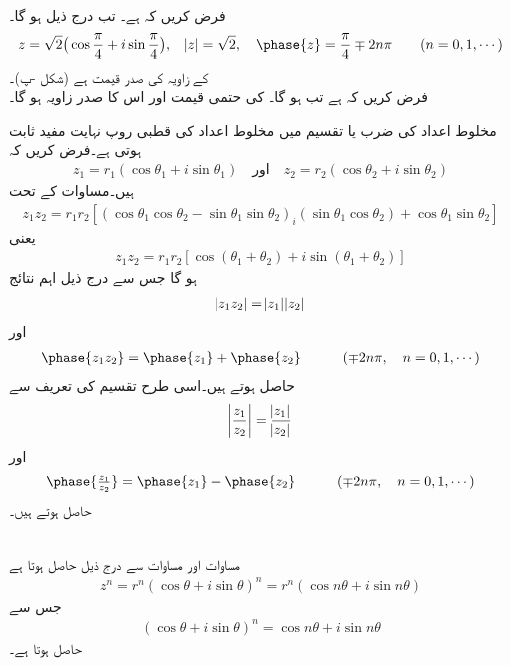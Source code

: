 \quad {}\\
فرض کریں کہ  ہے۔ تب درج ذیل ہو گا۔
\begin{align*}
z=\sqrt{2}\big(\cos \frac{\pi}{4}+i\sin\frac{\pi}{4}\big), \quad \abs{z}=\sqrt{2},\quad \phase{z}=\frac{\pi}{4}\mp2n\pi \quad \quad (n=0,1,\cdots)
\end{align*}
 کے زاویہ کی صدر قیمت  ہے (شکل -پ)۔
\quad {}\\
فرض کریں کہ  ہے تب  ہو گا۔ کی حتمی قیمت  اور اس کا صدر زاویہ  ہو گا۔

مخلوط اعداد کی  ضرب یا تقسیم میں مخلوط اعداد کی قطبی روپ نہایت مفید ثابت ہوتی ہے۔فرض کریں کہ
\begin{align*}
z_1=r_1(\cos\theta_1+i\sin\theta_1)\quad \text{اور}\quad z_2=r_2(\cos \theta_2+i\sin\theta_2)
\end{align*} 
ہیں۔مساوات  کے تحت 
\begin{align*}
z_1z_2=r_1r_2[(\cos\theta_1\cos\theta_2-\sin\theta_1\sin\theta_2)_i(\sin\theta_1\cos\theta_2)+\cos\theta_1\sin\theta_2]
\end{align*}
یعنی
\begin{align}\label{مساوات_مخلوط_ضرب_نتائج_الف}
z_1z_2=r_1r_2[\cos(\theta_1+\theta_2)+i\sin(\theta_1+\theta_2)]
\end{align}
ہو گا جس سے درج ذیل اہم نتائج
\begin{align}\label{مساوات_مخلوط_ضرب_نتائج_ب}
\abs{z_1z_2}=\abs{z_1}\abs{z_2}
\end{align}
اور
\begin{align}\label{مساوات_مخلوط_ضرب_نتائج_پ}
\phase{z_1z_2}=\phase{z_1}+\phase{z_2}\quad \quad\quad (\mp 2n\pi, \quad n=0,1,\cdots)
\end{align}
حاصل ہوتے ہیں۔اسی طرح تقسیم کی تعریف سے 
\begin{align}\label{مساوات_مخلوط_تقسیم_نتائج_الف}
\abs{\frac{z_1}{z_2}}=\frac{\abs{z_1}}{\abs{z_2}}
\end{align}
اور
\begin{align}\label{مساوات_مخلوط_تقسیم_نتائج_ب}
\phase{\tfrac{z_1}{z_2}}=\phase{z_1}-\phase{z_2} \quad \quad\quad (\mp 2n\pi, \quad n=0,1,\cdots)
\end{align}
حاصل ہوتے ہیں۔

\quad {}\\ 
مساوات  اور مساوات  سے درج ذیل حاصل ہوتا ہے
\begin{align}
z^n=r^n(\cos \theta+i\sin\theta)^n=r^n(\cos n\theta+i\sin n\theta)
\end{align}
جس سے  
\begin{align}
(\cos\theta+i\sin\theta)^n=\cos n\theta+i\sin n\theta
\end{align}
حاصل ہوتا ہے۔
